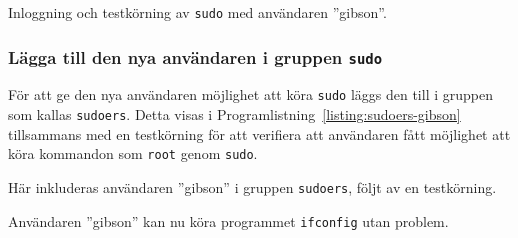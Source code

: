 \begin{listing}[H]
\caption[Logga in med annan användare]{Inloggning och testkörning av
         \texttt{sudo} med användaren ''gibson''.}
\label{listing:su-gibson}
\end{listing}


\subsubsection{Lägga till den nya användaren i gruppen \texttt{sudo}}
För att ge den nya användaren möjlighet att köra \texttt{sudo} läggs den till i
gruppen som kallas \texttt{sudoers}. Detta visas i
Programlistning~\ref{listing:sudoers-gibson} tillsammans med en testkörning för
att verifiera att användaren fått möjlighet att köra kommandon som
\texttt{root} genom \texttt{sudo}.

\begin{listing}[H]
\caption[Lägga till användare i gruppen \texttt{sudoers}]
        {Här inkluderas användaren ''gibson'' i gruppen \texttt{sudoers},
         följt av en testkörning.}
\label{listing:sudoers-gibson}
\end{listing}


Användaren ''gibson'' kan nu köra programmet \texttt{ifconfig} utan problem.
